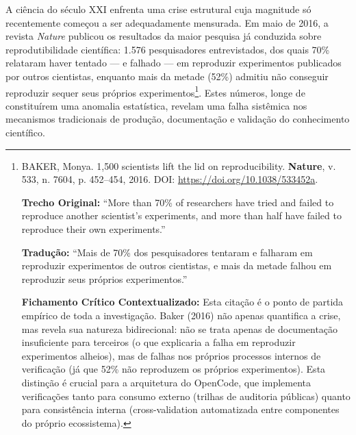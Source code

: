 A ciência do século XXI enfrenta uma crise estrutural cuja magnitude só recentemente começou a ser adequadamente mensurada. Em maio de 2016, a revista \textit{Nature} publicou os resultados da maior pesquisa já conduzida sobre reprodutibilidade científica: 1.576 pesquisadores entrevistados, dos quais 70\% relataram haver tentado --- e falhado --- em reproduzir experimentos publicados por outros cientistas, enquanto mais da metade (52\%) admitiu não conseguir reproduzir sequer seus próprios experimentos\footnote{
  BAKER, Monya. 1,500 scientists lift the lid on reproducibility. \textbf{Nature}, v. 533, n. 7604, p. 452--454, 2016. DOI: \url{https://doi.org/10.1038/533452a}.

  \textbf{Trecho Original:} ``More than 70\% of researchers have tried and failed to reproduce another scientist's experiments, and more than half have failed to reproduce their own experiments.''

  \textbf{Tradução:} ``Mais de 70\% dos pesquisadores tentaram e falharam em reproduzir experimentos de outros cientistas, e mais da metade falhou em reproduzir seus próprios experimentos.''

  \textbf{Fichamento Crítico Contextualizado:} Esta citação é o ponto de partida empírico de toda a investigação. Baker (2016) não apenas quantifica a crise, mas revela sua natureza bidirecional: não se trata apenas de documentação insuficiente para terceiros (o que explicaria a falha em reproduzir experimentos alheios), mas de falhas nos próprios processos internos de verificação (já que 52\% não reproduzem os próprios experimentos). Esta distinção é crucial para a arquitetura do OpenCode, que implementa verificações tanto para consumo externo (trilhas de auditoria públicas) quanto para consistência interna (cross-validation automatizada entre componentes do próprio ecossistema).
}. Estes números, longe de constituírem uma anomalia estatística, revelam uma falha sistêmica nos mecanismos tradicionais de produção, documentação e validação do conhecimento científico.

